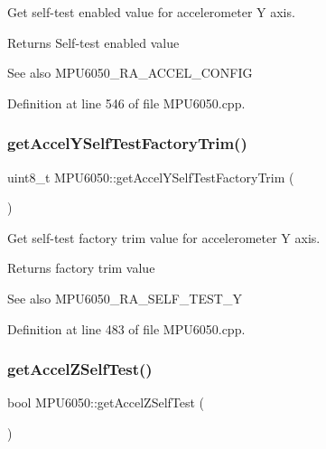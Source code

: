 Get self-\/test enabled value for accelerometer Y axis. 

\begin{DoxyReturn}{Returns}
Self-\/test enabled value 
\end{DoxyReturn}
\begin{DoxySeeAlso}{See also}
M\+P\+U6050\+\_\+\+R\+A\+\_\+\+A\+C\+C\+E\+L\+\_\+\+C\+O\+N\+F\+IG 
\end{DoxySeeAlso}


Definition at line 546 of file M\+P\+U6050.\+cpp.

\mbox{\label{classMPU6050_ae219dc9651d4d42a918e553b03e4e7bf}} 
\subsubsection{\texorpdfstring{getAccelYSelfTestFactoryTrim()}{getAccelYSelfTestFactoryTrim()}}
{\footnotesize\ttfamily uint8\+\_\+t M\+P\+U6050\+::get\+Accel\+Y\+Self\+Test\+Factory\+Trim (\begin{DoxyParamCaption}{ }\end{DoxyParamCaption})}



Get self-\/test factory trim value for accelerometer Y axis. 

\begin{DoxyReturn}{Returns}
factory trim value 
\end{DoxyReturn}
\begin{DoxySeeAlso}{See also}
M\+P\+U6050\+\_\+\+R\+A\+\_\+\+S\+E\+L\+F\+\_\+\+T\+E\+S\+T\+\_\+Y 
\end{DoxySeeAlso}


Definition at line 483 of file M\+P\+U6050.\+cpp.

\mbox{\label{classMPU6050_a57710638eeb6176cf14a8c444bda5300}} 
\subsubsection{\texorpdfstring{getAccelZSelfTest()}{getAccelZSelfTest()}}
{\footnotesize\ttfamily bool M\+P\+U6050\+::get\+Accel\+Z\+Self\+Test (\begin{DoxyParamCaption}{ }\end{DoxyParamCaption})}



